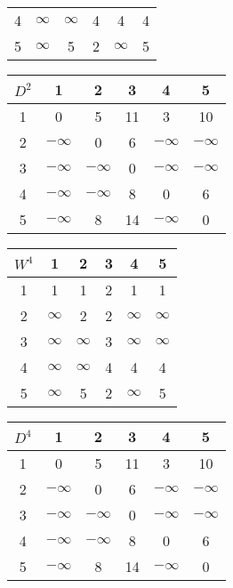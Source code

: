 \documentclass{article}
\begin{document}
\begin{enumerate}[label=(\alph*)]
\begin{center}
\begin{tabular}{c|ccccc}
				4 & $\infty$ & \cellcolor{blue!20}$\infty$ & 4 & 4 & 4 \\
				5 & $\infty$ & \cellcolor{blue!20}5 & 2 & $\infty$ & 5
			\end{tabular}
			\begin{tabular}{c|ccccc}
				$D^2$ & 1 & 2 & 3 & 4 & 5 \\
				\hline
				1 & 0 & \cellcolor{blue!20}5 & 11 & 3 & 10 \\
				2 & \cellcolor{blue!20}$-\infty$ & \cellcolor{blue!20}0 & \cellcolor{blue!20}6 & \cellcolor{blue!20}$-\infty$ & \cellcolor{blue!20}$-\infty$ \\
				3 & $-\infty$ & \cellcolor{blue!20}$-\infty$ & 0 & $-\infty$ & $-\infty$ \\
				4 & $-\infty$ & \cellcolor{blue!20}$-\infty$ & 8 & 0 & 6 \\
				5 & $-\infty$ & \cellcolor{blue!20}8 & 14 & $-\infty$ & 0
			\end{tabular}
		\end{center}
		\begin{center}
			\begin{tabular}{c|ccccc}
				$W^4$ & 1 & 2 & 3 & 4 & 5 \\
				\hline
				1 & 1 & 1 & 2 & \cellcolor{blue!20}1 & 1 \\
				2 & $\infty$ & 2 & 2 & \cellcolor{blue!20}$\infty$ & $\infty$ \\
				3 & $\infty$ & $\infty$ & 3 & \cellcolor{blue!20}$\infty$ & $\infty$ \\
				4 & \cellcolor{blue!20}$\infty$ & \cellcolor{blue!20}$\infty$ & \cellcolor{blue!20}4 & \cellcolor{blue!20}4 & \cellcolor{blue!20}4 \\
				5 & $\infty$ & 5 & 2 & \cellcolor{blue!20}$\infty$ & 5
			\end{tabular}
			\begin{tabular}{c|ccccc}
				$D^4$ & 1 & 2 & 3 & 4 & 5 \\
				\hline
				1 & 0 & 5 & 11 & \cellcolor{blue!20}3 & 10 \\
				2 & $-\infty$ & 0 & 6 & \cellcolor{blue!20}$-\infty$ & $-\infty$ \\
				3 & $-\infty$ & $-\infty$ & 0 & \cellcolor{blue!20}$-\infty$ & $-\infty$ \\
				4 & \cellcolor{blue!20}$-\infty$ & \cellcolor{blue!20}$-\infty$ & \cellcolor{blue!20}8 & \cellcolor{blue!20}0 & \cellcolor{blue!20}6 \\
				5 & $-\infty$ & 8 & 14 & \cellcolor{blue!20}$-\infty$ & 0
			\end{tabular}

\end{center}
\end{enumerate}
\end{document}
